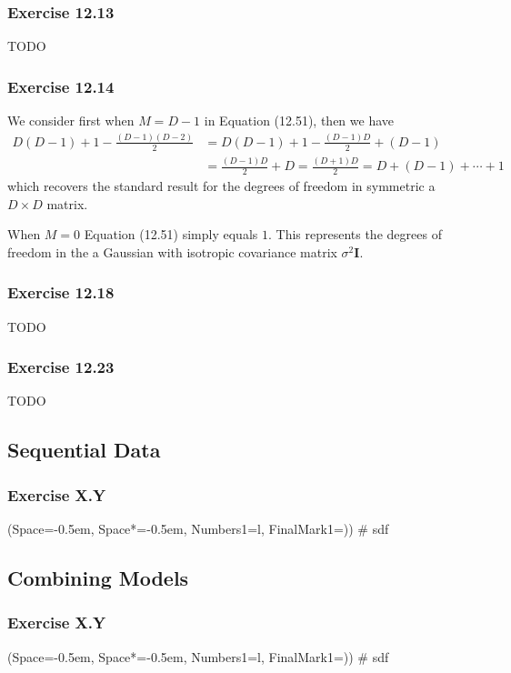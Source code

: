\documentclass[12pt, a4paper]{article}
\newcommand{\listSpace}{-0.5em}%
\newcommand{\vect}[1]{\bm{#1}}
\begin{document}
\subsubsection*{Exercise 12.13}
TODO

\subsubsection*{Exercise 12.14}
We consider first when $M = D - 1$ in Equation (12.51), then we have
\begin{align*}
	D(D-1) + 1 - \frac{(D-1)(D-2)}{2} &=
	D(D-1) + 1 - \frac{(D-1)D}{2} + (D-1) \\
	&= \frac{(D-1)D}{2} + D = \frac{(D+1)D}{2} = D + (D-1) + \cdots + 1
\end{align*}
which recovers the standard result for the degrees of freedom in symmetric a $D \times D$ matrix.

When $M=0$ Equation (12.51) simply equals $1$.
This represents the degrees of freedom in the a Gaussian with isotropic covariance matrix $\sigma^2 \vect{I}$.

\subsubsection*{Exercise 12.18}
TODO

\subsubsection*{Exercise 12.23}
TODO

\subsection{Sequential Data}
\subsubsection*{Exercise X.Y}
\begin{easylist}[enumerate]
	\ListProperties(Space=\listSpace, Space*=\listSpace, Numbers1=l, FinalMark1={)})
	# sdf
\end{easylist}

\subsection{Combining Models}
\subsubsection*{Exercise X.Y}
\begin{easylist}[enumerate]
	\ListProperties(Space=\listSpace, Space*=\listSpace, Numbers1=l, FinalMark1={)})
	# sdf
\end{easylist}
\end{document}
